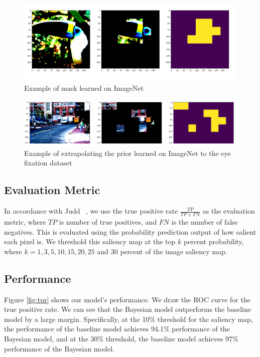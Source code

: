 \documentclass[10pt,twocolumn,letterpaper]{article}
\begin{document}
\begin{figure}
	\begin{center}
		\includegraphics[width=\columnwidth]{figures/bird_mask_predict.png}
		
	\end{center}
	\caption{Example of mask learned on ImageNet}
	\label{fig:birdmask}
\end{figure}

\begin{figure}
	\begin{center}
		\includegraphics[width=\columnwidth]{figures/road.png}		
	\end{center}
	\caption{Example of extrapolating the prior learned on ImageNet to the eye fixation dataset}
	\label{fig:street}
\end{figure}

\subsection{Evaluation Metric}

In accordance with Judd \etal~\cite{Judd}, we use the true positive rate
$\frac{TP}{TP + FN}$ as the evaluation metric, where $TP$ is number of true positives, and $FN$ is the
number of false negatives. This is evaluated using the probability prediction
output of how salient each pixel is. We threshold this saliency map at the top
$k$ percent probability, where $k=1, 3, 5, 10, 15, 20, 25$ and 30 percent of
the image saliency map. 

\subsection{Performance}
Figure \ref{fig:tpr} shows our model's performance. We draw the ROC curve for the true
positive rate. We can see that the Bayesian model outperforms the baseline
model by a large margin. Specifically, at the 10\% threshold for the saliency map, the
performance of the baseline model achieves 94.1\% performance of the Bayesian
model, and at the 30\% threshold, the baseline model achieves 97\% performance
of the Bayesian model.
\end{document}
